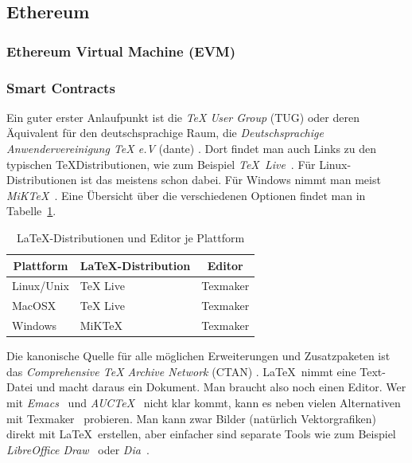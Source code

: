 \documentclass[11pt,a4paper]{report}
\begin{document}
\subsection{Ethereum}
\subsubsection{Ethereum Virtual Machine (EVM)}
\subsubsection{Smart Contracts}

Ein guter erster Anlaufpunkt ist die \textit{TeX User Group} (TUG) 
\cite{tug} oder deren Äquivalent für den deutschsprachige Raum, die 
\textit{Deutschsprachige Anwendervereinigung TeX e.V} (dante) \cite{dante}. 
Dort findet man auch Links zu den typischen \TeX\-Distributionen,
wie zum Beispiel \mbox{\textit{TeX Live}}~\cite{texlive}.
Für Linux-Distributionen ist das meistens schon dabei.
Für Windows nimmt man meist \textit{MiKTeX}~\cite{miktex}.
Eine Übersicht über die verschiedenen Optionen findet man 
in Tabelle~\ref{tab:disteditplattform}.
\begin{table}
\centering
\begin{tabular}{|l||l|l|}
\hline
\multicolumn{1}{|c|}{\textbf{Plattform}} & 
\multicolumn{1}{|c|}{\textbf{\LaTeX-Distribution}} & 
\multicolumn{1}{|c|}{\textbf{Editor}} \\\hline\hline
Linux/Unix & TeX Live & Texmaker \\\hline
MacOSX     & TeX Live & Texmaker \\\hline
Windows    & MiKTeX   & Texmaker \\\hline   
\end{tabular}
\caption{\LaTeX-Distributionen und Editor je Plattform}
\label{tab:disteditplattform}
\end{table}
Die kanonische Quelle für alle möglichen Erweiterungen und Zusatzpaketen 
ist das 
\textit{Comprehensive TeX Archive Network} (CTAN) \cite{ctan}.
\LaTeX\ nimmt eine Text-Datei und macht daraus ein Dokument.
Man braucht also noch einen Editor. 
Wer mit \textit{Emacs}~\cite{emacs} und \textit{AUCTeX}~\cite{auctex} nicht 
klar kommt, kann es neben vielen Alternativen mit Texmaker~\cite{texmaker} 
probieren.
Man kann zwar Bilder (natürlich Vektorgrafiken) direkt mit \LaTeX\ erstellen,
aber einfacher sind separate Tools wie zum Beispiel 
\textit{LibreOffice Draw}~\cite{libreoffice} oder \textit{Dia}~\cite{dia}.
\end{document}
